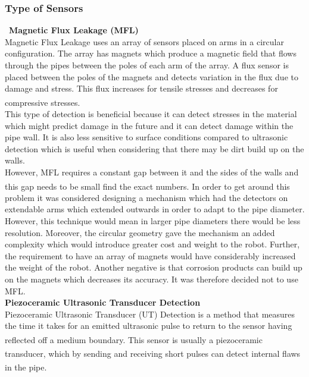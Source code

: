 \documentclass[11pt]{article}		%
\newcommand{\supercite}[1]{\textsuperscript{\cite{#1}}}		%
\begin{document}
	        \subsubsection{Type of Sensors}
	        \
	        \textbf{Magnetic Flux Leakage (MFL)}
	        \\
	        Magnetic Flux Leakage uses an array of sensors placed on arms in a circular configuration. 
	        The array has magnets which produce a magnetic field that flows through the pipes between the poles of each arm of the array.
	        A flux sensor is placed between the poles of the magnets and detects variation in the flux due to damage and stress.
	        This flux increases for tensile stresses and decreases for compressive stresses.\supercite{MFL_explanation}
	        \\
	        This type of detection is beneficial because it can detect stresses in the material which might predict damage in the future and it can detect damage within the pipe wall.
	        It is also less sensitive to surface conditions compared to ultrasonic detection which is useful when considering that there may be dirt build up on the walls.
	        \\
	        However, MFL requires a constant gap between it and the sides of the walls and this gap needs to be small find the exact numbers.\supercite{MFL_explanation} 
	        In order to get around this problem it was considered designing a mechanism which had the detectors on extendable arms which extended outwards in order to adapt to the pipe diameter. 
	        However, this technique would mean in larger pipe diameters there would be less resolution. 
	        Moreover, the circular geometry gave the mechanism an added complexity which would introduce greater cost and weight to the robot. 
	        Further, the requirement to have an array of magnets would have considerably increased the weight of the robot. %
	        Another negative is that corrosion products can build up on the magnets which decreases its accuracy. It was therefore decided not to use MFL.
	        \\
	        \textbf{Piezoceramic Ultrasonic Transducer Detection}
	        \\
	        Piezoceramic Ultrasonic Transducer (UT) Detection is a method that measures the time it takes for an emitted ultrasonic pulse to return to the sensor having reflected off a medium boundary.\supercite{UT_explanation}
	        This sensor is usually a piezoceramic transducer\supercite{UT}, which by sending and receiving short pulses can detect internal flaws in the pipe.\supercite{Corrosion}
\end{document}
